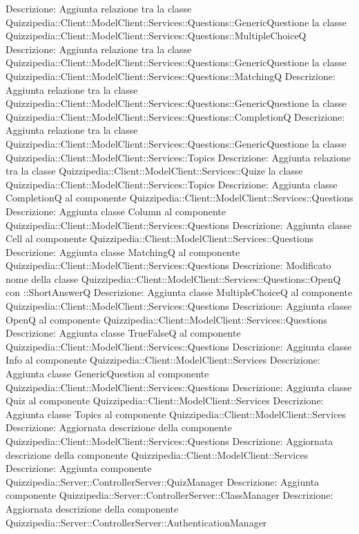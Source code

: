 Descrizione: Aggiunta relazione tra la classe Quizzipedia::Client::ModelClient::Services::Questions::GenericQuestione la classe Quizzipedia::Client::ModelClient::Services::Questions::MultipleChoiceQ 
Descrizione: Aggiunta relazione tra la classe Quizzipedia::Client::ModelClient::Services::Questions::GenericQuestione la classe Quizzipedia::Client::ModelClient::Services::Questions::MatchingQ 
Descrizione: Aggiunta relazione tra la classe Quizzipedia::Client::ModelClient::Services::Questions::GenericQuestione la classe Quizzipedia::Client::ModelClient::Services::Questions::CompletionQ 
Descrizione: Aggiunta relazione tra la classe Quizzipedia::Client::ModelClient::Services::Questions::GenericQuestione la classe Quizzipedia::Client::ModelClient::Services::Topics 
Descrizione: Aggiunta relazione tra la classe Quizzipedia::Client::ModelClient::Services::Quize la classe Quizzipedia::Client::ModelClient::Services::Topics 
Descrizione: Aggiunta classe CompletionQ al componente Quizzipedia::Client::ModelClient::Services::Questions 
Descrizione: Aggiunta classe Column al componente Quizzipedia::Client::ModelClient::Services::Questions 
Descrizione: Aggiunta classe Cell al componente Quizzipedia::Client::ModelClient::Services::Questions 
Descrizione: Aggiunta classe MatchingQ al componente Quizzipedia::Client::ModelClient::Services::Questions 
Descrizione: Modificato nome della classe Quizzipedia::Client::ModelClient::Services::Questions::OpenQ con ::ShortAnswerQ 
Descrizione: Aggiunta classe MultipleChoiceQ al componente Quizzipedia::Client::ModelClient::Services::Questions 
Descrizione: Aggiunta classe OpenQ al componente Quizzipedia::Client::ModelClient::Services::Questions 
Descrizione: Aggiunta classe TrueFalseQ al componente Quizzipedia::Client::ModelClient::Services::Questions 
Descrizione: Aggiunta classe Info al componente Quizzipedia::Client::ModelClient::Services 
Descrizione: Aggiunta classe GenericQuestion al componente Quizzipedia::Client::ModelClient::Services::Questions 
Descrizione: Aggiunta classe Quiz al componente Quizzipedia::Client::ModelClient::Services 
Descrizione: Aggiunta classe Topics al componente Quizzipedia::Client::ModelClient::Services 
Descrizione: Aggiornata descrizione della componente Quizzipedia::Client::ModelClient::Services::Questions 
Descrizione: Aggiornata descrizione della componente Quizzipedia::Client::ModelClient::Services 
Descrizione: Aggiunta componente Quizzipedia::Server::ControllerServer::QuizManager 
Descrizione: Aggiunta componente Quizzipedia::Server::ControllerServer::ClassManager 
Descrizione: Aggiornata descrizione della componente Quizzipedia::Server::ControllerServer::AuthenticationManager 
